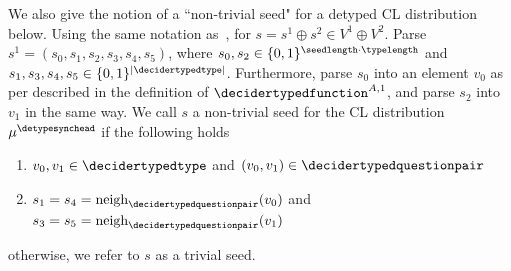 We also give the notion of a ``non-trivial seed" for a detyped CL distribution below. Using the same notation as~, for $s = s^1 \oplus s^2 \in V^1 \oplus  V^2$. Parse $s^1 = (s_0,s_1, s_2, s_3, s_4, s_5)$, where $s_0, s_2 \in \{0,1\}^{\seedlength \cdot \typelength}$ and $s_1, s_3, s_4, s_5 \in \{0,1\}^{|\decidertypedtype|}$. Furthermore, parse $s_0$ into an element $v_0$ as per described in the definition of $\decidertypedfunction^{A,1}$, and parse $s_2$ into $v_1$ in the same way. We call $s$ a non-trivial seed for the CL distribution  $\mu^{\detypesynchead}$ if the following holds
\begin{enumerate}
	\item $v_0, v_1 \in \decidertypedtype$ and $(v_0, v_1) \in \decidertypedquestionpair$
	\item $s_1 = s_4 = \text{neigh}_{\decidertypedquestionpair}(v_0)$ and $s_3= s_5 = \text{neigh}_{\decidertypedquestionpair}(v_1)$
\end{enumerate}
otherwise, we refer to $s$ as a trivial seed. 

